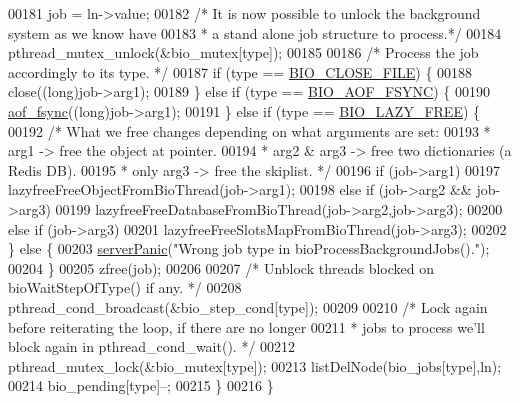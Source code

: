 \begin{DoxyCode}
{{00181         job = ln->value;
00182         \textcolor{comment}{/* It is now possible to unlock the background system as we know have}
00183 \textcolor{comment}{         * a stand alone job structure to process.*/}
00184         pthread\_mutex\_unlock(&bio\_mutex[type]);
00185 
00186         \textcolor{comment}{/* Process the job accordingly to its type. */}
00187         \textcolor{keywordflow}{if} (type == \hyperlink{bio_8h_ac5890d1af5c5d32376c47ad6b83c2af4}{BIO\_CLOSE\_FILE}) \{
00188             close((\textcolor{keywordtype}{long})job->arg1);
00189         \} \textcolor{keywordflow}{else} \textcolor{keywordflow}{if} (type == \hyperlink{bio_8h_a5d03c967316addafc61b7ed5d957984f}{BIO\_AOF\_FSYNC}) \{
00190             \hyperlink{config_8h_af5994c643c434574580bb7816af82cad}{aof\_fsync}((\textcolor{keywordtype}{long})job->arg1);
00191         \} \textcolor{keywordflow}{else} \textcolor{keywordflow}{if} (type == \hyperlink{bio_8h_afdc82658b2e29c63afcdb2e808b8a510}{BIO\_LAZY\_FREE}) \{
00192             \textcolor{comment}{/* What we free changes depending on what arguments are set:}
00193 \textcolor{comment}{             * arg1 -> free the object at pointer.}
00194 \textcolor{comment}{             * arg2 & arg3 -> free two dictionaries (a Redis DB).}
00195 \textcolor{comment}{             * only arg3 -> free the skiplist. */}
00196             \textcolor{keywordflow}{if} (job->arg1)
00197                 lazyfreeFreeObjectFromBioThread(job->arg1);
00198             \textcolor{keywordflow}{else} \textcolor{keywordflow}{if} (job->arg2 && job->arg3)
00199                 lazyfreeFreeDatabaseFromBioThread(job->arg2,job->arg3);
00200             \textcolor{keywordflow}{else} \textcolor{keywordflow}{if} (job->arg3)
00201                 lazyfreeFreeSlotsMapFromBioThread(job->arg3);
00202         \} \textcolor{keywordflow}{else} \{
00203             \hyperlink{server_8h_a11cc378e7778a830b41240578de3b204}{serverPanic}(\textcolor{stringliteral}{"Wrong job type in bioProcessBackgroundJobs()."});
00204         \}
00205         zfree(job);
00206 
00207         \textcolor{comment}{/* Unblock threads blocked on bioWaitStepOfType() if any. */}
00208         pthread\_cond\_broadcast(&bio\_step\_cond[type]);
00209 
00210         \textcolor{comment}{/* Lock again before reiterating the loop, if there are no longer}
00211 \textcolor{comment}{         * jobs to process we'll block again in pthread\_cond\_wait(). */}
00212         pthread\_mutex\_lock(&bio\_mutex[type]);
00213         listDelNode(bio\_jobs[type],ln);
00214         bio\_pending[type]--;
00215     \}
00216 \}
}}
\end{DoxyCode}
